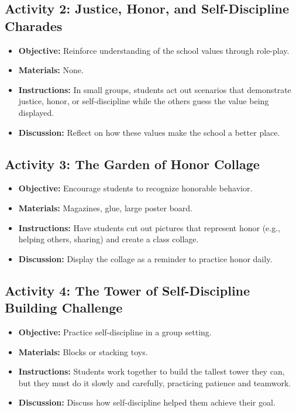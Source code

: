 \documentclass[11pt]{article}
\begin{document}
\subsection{Activity 2: Justice, Honor, and Self-Discipline Charades}
\label{sec:orgb56ca4d}
\begin{itemize}
\item \textbf{\textbf{Objective:}} Reinforce understanding of the school values through role-play.
\item \textbf{\textbf{Materials:}} None.
\item \textbf{\textbf{Instructions:}} In small groups, students act out scenarios that demonstrate justice, honor, or self-discipline while the others guess the value being displayed.
\item \textbf{\textbf{Discussion:}} Reflect on how these values make the school a better place.
\end{itemize}

\subsection{Activity 3: The Garden of Honor Collage}
\label{sec:orgc5bcc3a}
\begin{itemize}
\item \textbf{\textbf{Objective:}} Encourage students to recognize honorable behavior.
\item \textbf{\textbf{Materials:}} Magazines, glue, large poster board.
\item \textbf{\textbf{Instructions:}} Have students cut out pictures that represent honor (e.g., helping others, sharing) and create a class collage.
\item \textbf{\textbf{Discussion:}} Display the collage as a reminder to practice honor daily.
\end{itemize}

\subsection{Activity 4: The Tower of Self-Discipline Building Challenge}
\label{sec:orged7bd11}
\begin{itemize}
\item \textbf{\textbf{Objective:}} Practice self-discipline in a group setting.
\item \textbf{\textbf{Materials:}} Blocks or stacking toys.
\item \textbf{\textbf{Instructions:}} Students work together to build the tallest tower they can, but they must do it slowly and carefully, practicing patience and teamwork.
\item \textbf{\textbf{Discussion:}} Discuss how self-discipline helped them achieve their goal.
\end{itemize}
\newpage
\end{document}
